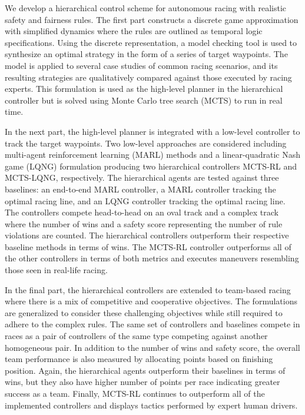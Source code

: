 \documentclass[12pt]{report}
\theoremstyle{definition}
\theoremstyle{remark}
\numberwithin{equation}{section}
\begin{document}
%
\utabstract
\indent 
We develop a hierarchical control scheme for autonomous racing with realistic safety and fairness rules. The first part constructs a discrete game approximation with simplified dynamics where the rules are outlined as temporal logic specifications. Using the discrete representation, a model checking tool is used to synthesize an optimal strategy in the form of a series of target waypoints. The model is applied to several case studies of common racing scenarios, and its resulting strategies are qualitatively compared against those executed by racing experts. This formulation is used as the high-level planner in the hierarchical controller but is solved using Monte Carlo tree search (MCTS) to run in real time.

In the next part, the high-level planner is integrated with a low-level controller to track the target waypoints. Two low-level approaches are considered including multi-agent reinforcement learning (MARL) methods and a linear-quadratic Nash game (LQNG) formulation producing two hierarchical controllers MCTS-RL and MCTS-LQNG, respectively. The hierarchical agents are tested against three baselines: an end-to-end MARL controller, a MARL controller tracking the optimal racing line, and an LQNG controller tracking the optimal racing line. The controllers compete head-to-head on an oval track and a complex track where the number of wins and a safety score representing the number of rule violations are counted. The hierarchical controllers outperform their respective baseline methods in terms of wins. The MCTS-RL controller outperforms all of the other controllers in terms of both metrics and executes maneuvers resembling those seen in real-life racing.

In the final part, the hierarchical controllers are extended to team-based racing where there is a mix of competitive and cooperative objectives. The formulations are generalized to consider these challenging objectives while still required to adhere to the complex rules. The same set of controllers and baselines compete in races as a pair of controllers of the same type competing against another homogeneous pair. In addition to the number of wins and safety score, the overall team performance is also measured by allocating points based on finishing position. Again, the hierarchical agents outperform their baselines in terms of wins, but they also have higher number of points per race indicating greater success as a team. Finally, MCTS-RL continues to outperform all of the implemented controllers and displays tactics performed by expert human drivers.
\end{document}
